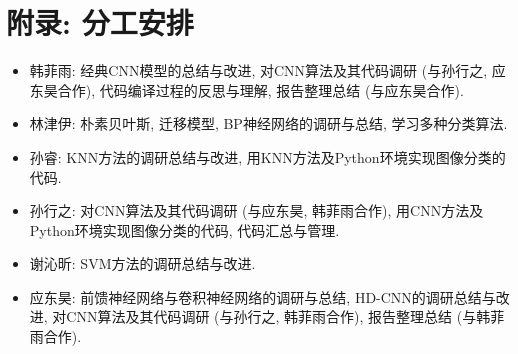 \documentclass[lang=cn, 11pt,   a4paper]{elegantpaper}
\begin{document}
\nocite{*}


\section*{附录: 分工安排}
\begin{itemize}
	\item 韩菲雨: 经典CNN模型的总结与改进, 对CNN算法及其代码调研 (与孙行之, 应东昊合作), 代码编译过程的反思与理解, 报告整理总结 (与应东昊合作).
	\item 林津伊: 朴素贝叶斯, 迁移模型, BP神经网络的调研与总结, 学习多种分类算法.
	\item 孙睿: KNN方法的调研总结与改进, 用KNN方法及Python环境实现图像分类的代码.
	\item 孙行之: 对CNN算法及其代码调研 (与应东昊, 韩菲雨合作), 用CNN方法及Python环境实现图像分类的代码, 代码汇总与管理.
	\item 谢沁昕: SVM方法的调研总结与改进.
	\item 应东昊: 前馈神经网络与卷积神经网络的调研与总结, HD-CNN的调研总结与改进, 对CNN算法及其代码调研 (与孙行之, 韩菲雨合作), 报告整理总结 (与韩菲雨合作).
\end{itemize}
\end{document}
